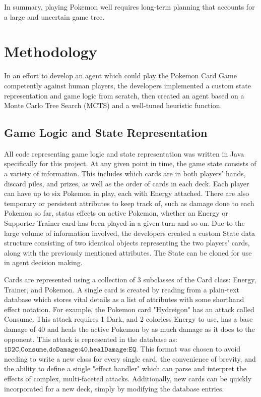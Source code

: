 \documentclass{article}
\begin{document}
In summary, playing Pokemon well requires long-term planning that accounts for a large and uncertain game tree.

\section{Methodology} %
 
In an effort to develop an agent which could play the Pokemon Card Game competently against human players, the developers implemented a custom state representation and game logic from scratch, then created an agent based on a Monte Carlo Tree Search (MCTS) and a well-tuned heuristic function. 

\subsection{Game Logic and State Representation} %

All code representing game logic and state representation was written in Java specifically for this project.  At any given point in time, the game state consists of a variety of information.  This includes which cards are in both players' hands, discard piles, and prizes, as well as the order of cards in each deck.  Each player can have up to six Pokemon in play, each with Energy attached.  There are also temporary or persistent attributes to keep track of, such as damage done to each Pokemon so far, status effects on active Pokemon, whether an Energy or Supporter Trainer card has been played in a given turn and so on.  Due to the large volume of information involved, the developers created a custom State data structure consisting of two identical objects representing the two players' cards, along with the previously mentioned attributes.  The State can be cloned for use in agent decision making.

Cards are represented using a collection of 3 subclasses of the Card class: Energy, Trainer, and Pokemon.  A single card is created by reading from a plain-text database which stores vital details as a list of attributes with some shorthand effect notation.  For example, the Pokemon card "Hydreigon" has an attack called Consume.  This attack requires 1 Dark, and 2 colorless Energy to use, has a base damage of 40 and heals the active Pokemon by as much damage as it does to the opponent.  This attack is represented in the database as: $\texttt{1D2C,Consume,doDamage:40,healDamage:EQ}$.  This format was chosen to avoid needing to write a new class for every single card, the convenience of brevity, and the ability to define a single "effect handler" which can parse and interpret the effects of complex, multi-faceted attacks.  Additionally, new cards can be quickly incorporated for a new deck, simply by modifying the database entries.
\end{document}
